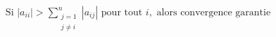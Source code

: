 \documentclass[preview]{standalone}
\begin{document}
\begin{align*}
\text{Si } |a_{ii}| > \sum_{\substack{j=1\\j\neq i}}^n |a_{ij}| \text{ pour tout } i,\text{ alors convergence garantie}
\end{align*}
\end{document}
